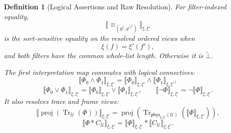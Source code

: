 \documentclass[acmsmall,screen,review,anonymous,nonacm]{acmart}
\newtheorem{definition}{Definition}[section]
\theoremstyle{defn_style}
\begin{document}
\begin{definition}[Logical Assertions and Raw Resolution]
For filter-indexed equality,
\[
\llbracket \equiv_{(g^f,g'^{f'})}\rrbracket_{\xi,\xi'}
\]
is the sort-sensitive equality on the resolved ordered views when
\[
\xi(f)=\xi'(f'),
\]
and both filters have the common whole-list length. Otherwise it is
\(\widetilde{\bot}\).

The first interpretation map commutes with logical connectives:
\[
\llbracket \Phi_0\land\Phi_1\rrbracket_{\xi,\xi'}
=
\llbracket\Phi_0\rrbracket_{\xi,\xi'}
\land
\llbracket\Phi_1\rrbracket_{\xi,\xi'},
\]
\[
\llbracket \Phi_0\lor\Phi_1\rrbracket_{\xi,\xi'}
=
\llbracket\Phi_0\rrbracket_{\xi,\xi'}
\lor
\llbracket\Phi_1\rrbracket_{\xi,\xi'},
\qquad
\llbracket\neg\Phi\rrbracket_{\xi,\xi'}
=
\neg\llbracket\Phi\rrbracket_{\xi,\xi'}.
\]
It also resolves trace and frame views:
\[
\llbracket
\operatorname{proj}\!\left(
\operatorname{Tr}_{\mathcal U}(\Phi)
\right)
\rrbracket_{\xi,\xi'}
=
\operatorname{proj}\!\left(
\operatorname{Tr}_{\mathsf{phys}_{\xi,\xi'}(\mathcal U)}
(\llbracket\Phi\rrbracket_{\xi,\xi'})
\right),
\]
\[
\llbracket \Phi*C_{\mathcal U}\rrbracket_{\xi,\xi'}
=
\llbracket\Phi\rrbracket_{\xi,\xi'}
*
\llbracket C_{\mathcal U}\rrbracket_{\xi,\xi'}.
\]
\end{definition}
\end{document}
